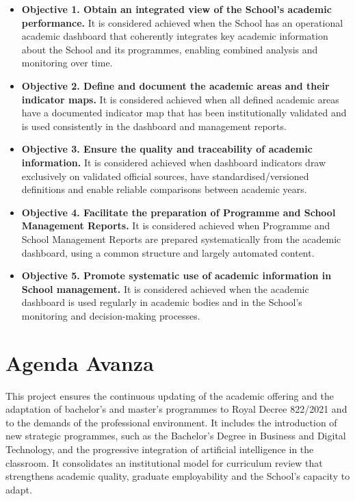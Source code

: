 \documentclass[11pt,a4paper]{scrreprt}
\begin{document}
\begin{itemize}[leftmargin=1.5em,itemsep=6pt,topsep=4pt]

\item \textbf{Objective 1. Obtain an integrated view of the School's academic performance.}  
It is considered achieved when the School has an operational academic dashboard that coherently integrates key academic information about the School and its programmes, enabling combined analysis and monitoring over time.

\item \textbf{Objective 2. Define and document the academic areas and their indicator maps.}  
It is considered achieved when all defined academic areas have a documented indicator map that has been institutionally validated and is used consistently in the dashboard and management reports.

\item \textbf{Objective 3. Ensure the quality and traceability of academic information.}  
It is considered achieved when dashboard indicators draw exclusively on validated official sources, have standardised/versioned definitions and enable reliable comparisons between academic years.

\item \textbf{Objective 4. Facilitate the preparation of Programme and School Management Reports.}  
It is considered achieved when Programme and School Management Reports are prepared systematically from the academic dashboard, using a common structure and largely automated content.

\item \textbf{Objective 5. Promote systematic use of academic information in School management.}  
It is considered achieved when the academic dashboard is used regularly in academic bodies and in the School's monitoring and decision-making processes.

\end{itemize}

\clearpage

\chapter[Agenda Avanza]{\textcolor{aacolor}{Agenda Avanza}}
\begin{tcolorbox}[descbox]
\small This project ensures the continuous updating of the academic offering and the adaptation of bachelor's and master's programmes to Royal Decree 822/2021 and to the demands of the professional environment. It includes the introduction of new strategic programmes, such as the Bachelor's Degree in Business and Digital Technology, and the progressive integration of artificial intelligence in the classroom. It consolidates an institutional model for curriculum review that strengthens academic quality, graduate employability and the School's capacity to adapt.
\end{tcolorbox}
\end{document}
